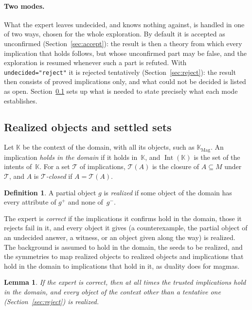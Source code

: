 \documentclass[11pt,a4paper]{article}
\newtheorem{lemma}[proposition]{Lemma}
\theoremstyle{definition}
\newtheorem{definition}{Definition}
\theoremstyle{remark}
\newcommand{\code}[1]{\texttt{#1}}
\newcommand{\pos}{^{+}}
\newcommand{\nega}{^{-}}
\newcommand{\Int}{\operatorname{Int}}
\begin{document}
\paragraph{Two modes.}
What the expert leaves undecided, and knows nothing against, is handled in one of two ways, chosen for the whole exploration. By default it is accepted as unconfirmed (Section~\ref{sec:accept}): the result is then a theory from which every implication that holds follows, but whose unconfirmed part may be false, and the exploration is resumed whenever such a part is refuted. With \code{undecided="reject"} it is rejected tentatively (Section~\ref{sec:reject}): the result then consists of proved implications only, and what could not be decided is listed as open. Section~\ref{sec:settled} sets up what is needed to state precisely what each mode establishes.

\subsection{Realized objects and settled sets}\label{sec:settled}

Let $\mathbb{K}$ be the context of the domain, with all its objects, such as $\mathbb{K}_{\mathrm{Mag}}$. An implication \emph{holds in the domain} if it holds in~$\mathbb{K}$, and $\Int(\mathbb{K})$ is the set of the intents of~$\mathbb{K}$. For a set $\mathcal{T}$ of implications, $\mathcal{T}(A)$ is the closure of $A \subseteq M$ under~$\mathcal{T}$, and $A$ is \emph{$\mathcal{T}$-closed} if $A = \mathcal{T}(A)$.

\begin{definition}\label{def:realized}
A partial object $g$ is \emph{realized} if some object of the domain has every attribute of $g\pos$ and none of~$g\nega$.
\end{definition}

The expert is \emph{correct} if the implications it confirms hold in the domain, those it rejects fail in it, and every object it gives (a counterexample, the partial object of an undecided answer, a witness, or an object given along the way) is realized. The background is assumed to hold in the domain, the seeds to be realized, and the symmetries to map realized objects to realized objects and implications that hold in the domain to implications that hold in it, as duality does for magmas.

\begin{lemma}\label{lem:realized}
If the expert is correct, then at all times the trusted implications hold in the domain, and every object of the context other than a tentative one (Section~\ref{sec:reject}) is realized.
\end{lemma}
\end{document}
